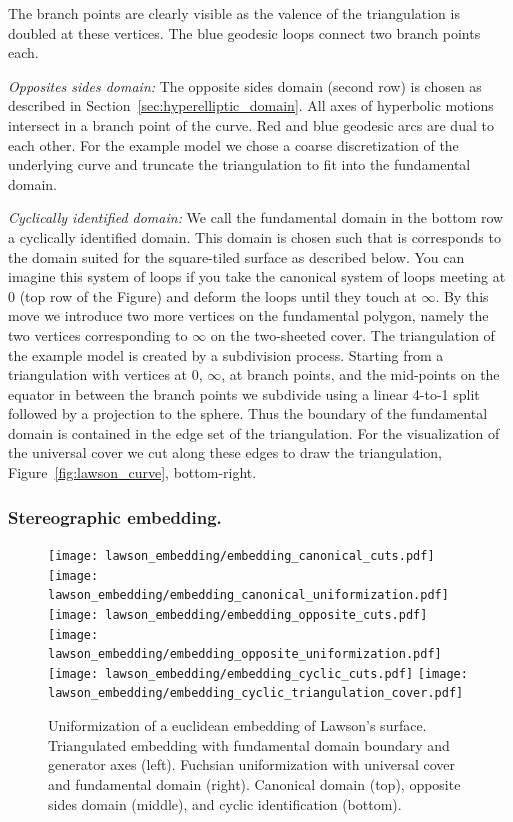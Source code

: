 \documentclass[Thesis.tex]{subfiles}
\begin{document}
The branch points are clearly visible as the valence of the triangulation is doubled at these vertices.
The blue geodesic loops connect two branch points each.

\textit{Opposites sides domain:}
The opposite sides domain (second row) is chosen as described in Section~\ref{sec:hyperelliptic_domain}.
All axes of hyperbolic motions intersect in a branch point of the curve.
Red and blue geodesic arcs are dual to each other.
For the example model we chose a coarse discretization of the underlying curve and truncate the triangulation to fit into the fundamental domain.

\textit{Cyclically identified domain:}
We call the fundamental domain in the bottom row a cyclically identified domain.
This domain is chosen such that is corresponds to the domain suited for the square-tiled surface as described below.
You can imagine this system of loops if you take the canonical system of loops meeting at $0$ (top row of the Figure) and deform the loops until they touch at $\infty$.
By this move we introduce two more vertices on the fundamental polygon, namely the two vertices corresponding to $\infty$ on the two-sheeted cover.
The triangulation of the example model is created by a subdivision process.
Starting from  a triangulation with vertices at $0$, $\infty$, at branch points, and the mid-points on the equator in between the branch points we subdivide using a linear 4-to-1 split followed by a projection to the sphere. Thus the boundary of the fundamental domain is contained in the edge set of the triangulation. For the visualization of the universal cover we cut along these edges to draw the triangulation, Figure~\ref{fig:lawson_curve}, bottom-right.

\subsubsection{Stereographic embedding.}

\begin{figure}
	\centering
	\resizebox{!}{6cm} {
	\texttt{[image: lawson\_embedding/embedding\_canonical\_cuts.pdf]}
	\texttt{[image: lawson\_embedding/embedding\_canonical\_uniformization.pdf]}
	}
	\resizebox{!}{6cm} {
	\texttt{[image: lawson\_embedding/embedding\_opposite\_cuts.pdf]}
	\texttt{[image: lawson\_embedding/embedding\_opposite\_uniformization.pdf]}
	}
	\resizebox{!}{6.5cm} {
	\texttt{[image: lawson\_embedding/embedding\_cyclic\_cuts.pdf]}
	\texttt{[image: lawson\_embedding/embedding\_cyclic\_triangulation\_cover.pdf]}
	}
	\caption{Uniformization of a euclidean embedding of Lawson's surface. Triangulated embedding with fundamental domain boundary and generator axes (left). Fuchsian uniformization with universal cover and fundamental domain (right). Canonical domain (top), opposite sides domain (middle), and cyclic identification (bottom).}
	\label{fig:lawson_embedding}
\end{figure}
\end{document}
